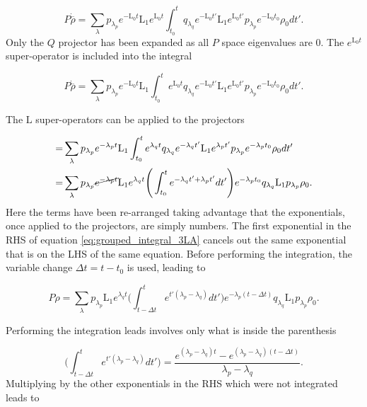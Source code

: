 \documentclass[12pt]{article}
\begin{document}
\begin{equation}
   P\dot{\overline{\rho}} = \sum_{\lambda} p_{\lambda_p} e^{-\mathrm{L}_0 t}\mathrm{L}_1e^{\mathrm{L}_0 t}\int_{t_0}^t  q_{\lambda_q}e^{-\mathrm{L}_0 t'}\mathrm{L}_1e^{\mathrm{L}_0 t'}p_{\lambda_p} e^{-\mathrm{L}_0 t_0}\rho_0 dt'.  
\end{equation} Only the $Q$ projector has been expanded as all $P$ space eigenvalues are 0. The $e^{\mathrm{L}_0 t}$ super-operator is included into the integral 

\begin{equation}
   P\dot{\overline{\rho}} = \sum_{\lambda} p_{\lambda_p} e^{-\mathrm{L}_0 t}\mathrm{L}_1\int_{t_0}^t  e^{\mathrm{L}_0 t}q_{\lambda_q}e^{-\mathrm{L}_0 t'}\mathrm{L}_1e^{\mathrm{L}_0 t'}p_{\lambda_p} e^{-\mathrm{L}_0 t_0}\rho_0 dt'.  
\end{equation} 

The $\mathrm{L}$ super-operators can be applied to the projectors 

\begin{align}
    =& \sum_{\lambda} p_{\lambda_p} e^{-\lambda_p t}\mathrm{L}_1\int_{t_0}^t  e^{\lambda_q t}q_{\lambda_q}e^{-\lambda_q t'}\mathrm{L}_1e^{\lambda_p t'}p_{\lambda_p} e^{-\lambda_p t_0}\rho_0 dt' \\
    =& \sum_{\lambda} p_{\lambda_p} \cancel{e^{-\lambda_p t}}\mathrm{L}_1e^{\lambda_q t}\Bigg(\int_{t_0}^te^{-\lambda_q t'+\lambda_p t'}dt'\Bigg)e^{-\lambda_p t_0}  q_{\lambda_q}\mathrm{L}_1p_{\lambda_p} \rho_0.\label{eq:grouped_integral_3LA}
\end{align} Here the terms have been re-arranged taking advantage that the exponentials, once applied to the projectors, are simply numbers. The first exponential in the RHS of equation \eqref{eq:grouped_integral_3LA} cancels out the same exponential that is on the LHS of the same equation. Before performing the integration, the variable change $\Delta t = t-t_0$ is used, leading to

\begin{equation}
    P\dot{\rho}=\sum_{\lambda} p_{\lambda_p} \mathrm{L}_1e^{\lambda_q t}\Bigg(\int_{t-\Delta t}^te^{t'(\lambda_p-\lambda_q) }dt'\Bigg)e^{-\lambda_p( t-\Delta t)}  q_{\lambda_q}\mathrm{L}_1p_{\lambda_p} \rho_0.
\end{equation}

Performing the integration leads involves only what is inside the parenthesis

\begin{equation}
  \Bigg(\int_{t-\Delta t}^te^{t'(\lambda_p-\lambda_q) }dt'\Bigg) = \frac{e^{(\lambda_p-\lambda_q)t}-e^{(\lambda_p-\lambda_q)(t-\Delta t)}}{\lambda_p-\lambda_q}.  
\end{equation} Multiplying by the other exponentials in the RHS which were not integrated leads to
\end{document}
